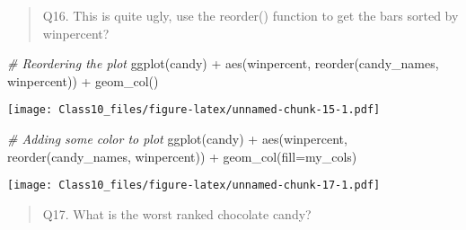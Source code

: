 \documentclass[
]{article}
\newenvironment{Shaded}{\begin{snugshade}}{\end{snugshade}}
\newcommand{\AttributeTok}[1]{\textcolor[rgb]{0.77,0.63,0.00}{#1}}
\newcommand{\CommentTok}[1]{\textcolor[rgb]{0.56,0.35,0.01}{\textit{#1}}}
\newcommand{\FunctionTok}[1]{\textcolor[rgb]{0.00,0.00,0.00}{#1}}
\newcommand{\NormalTok}[1]{#1}
\newcommand{\OtherTok}[1]{\textcolor[rgb]{0.56,0.35,0.01}{#1}}
\newcommand{\SpecialCharTok}[1]{\textcolor[rgb]{0.00,0.00,0.00}{#1}}
\newcommand{\StringTok}[1]{\textcolor[rgb]{0.31,0.60,0.02}{#1}}
\begin{document}
\begin{quote}
Q16. This is quite ugly, use the reorder() function to get the bars
sorted by winpercent?
\end{quote}

\begin{Shaded}
\begin{Highlighting}[]
\CommentTok{\# Reordering the plot}
\FunctionTok{ggplot}\NormalTok{(candy) }\SpecialCharTok{+} \FunctionTok{aes}\NormalTok{(winpercent, }\FunctionTok{reorder}\NormalTok{(candy\_names, winpercent)) }\SpecialCharTok{+} \FunctionTok{geom\_col}\NormalTok{()}
\end{Highlighting}
\end{Shaded}

\texttt{[image: Class10\_files/figure-latex/unnamed-chunk-15-1.pdf]}

\begin{Shaded}
\end{Shaded}

\begin{Shaded}
\begin{Highlighting}[]
\CommentTok{\# Adding some color to plot}
\FunctionTok{ggplot}\NormalTok{(candy) }\SpecialCharTok{+} \FunctionTok{aes}\NormalTok{(winpercent, }\FunctionTok{reorder}\NormalTok{(candy\_names, winpercent)) }\SpecialCharTok{+} \FunctionTok{geom\_col}\NormalTok{(}\AttributeTok{fill=}\NormalTok{my\_cols)}
\end{Highlighting}
\end{Shaded}

\texttt{[image: Class10\_files/figure-latex/unnamed-chunk-17-1.pdf]}

\begin{quote}
Q17. What is the worst ranked chocolate candy?
\end{quote}
\end{document}
